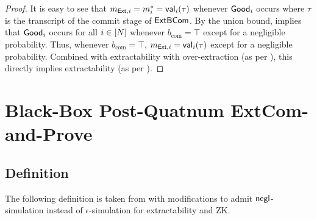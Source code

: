 \begin{proof}
It is easy to see that $m_{\mathsf{Ext},i}=m^*_i=\mathsf{val}_i(\tau)$
whenever $\mathsf{Good}_i$ occurs where $\tau$ is the transcript of the commit stage of $\mathsf{ExtBCom}$.  
By the union bound,   implies that $\mathsf{Good}_i$ occurs for all $i\in [N]$ whenever $b_{\mathrm{com}}=\top$ except for a negligible probability.  
Thus, whenever $b_{\mathrm{com}}=\top$, $m_{\mathsf{Ext},i}=\mathsf{val}_i(\tau)$ except for a negligible probability. Combined with extractability with over-extraction (as per ), this directly implies extractability  (as per ).
\end{proof}

\section{Black-Box Post-Quatnum ExtCom-and-Prove}
\label{sec:bb-extcom-n-prove}

\subsection{Definition}
The following definition is taken from \cite{C:CCLY22} with modifications to admit $\mathsf{negl}$-simulation instead of $\epsilon$-simulation for extractability and ZK. 

